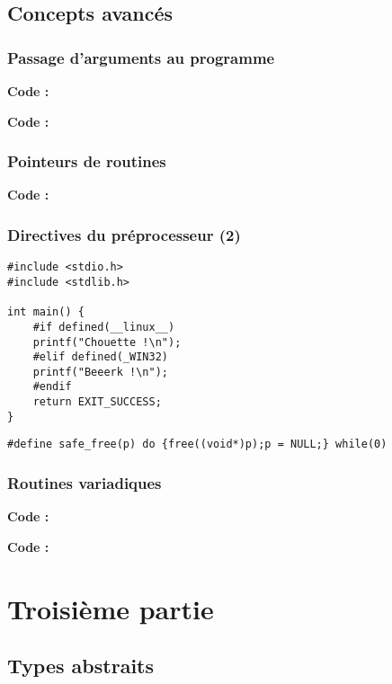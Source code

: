 \documentclass[../main.tex]{subfiles}
\begin{document}
\subsection{Concepts avancés}
\subsubsection{Passage d'arguments au programme}

\textbf{Code :} 


\textbf{Code :} 
\subsubsection{Pointeurs de routines}

\textbf{Code :} 
\subsubsection{Directives du préprocesseur (2)}
\begin{verbatim}
#include <stdio.h>
#include <stdlib.h>

int main() {
	#if defined(__linux__)
	printf("Chouette !\n");
	#elif defined(_WIN32)
	printf("Beeerk !\n");
	#endif
	return EXIT_SUCCESS;
}
\end{verbatim}
\begin{verbatim}
#define safe_free(p) do {free((void*)p);p = NULL;} while(0)
\end{verbatim}
\subsubsection{Routines variadiques}

\textbf{Code :} 


\textbf{Code :} 
\section{Troisième partie}
\subsection{Types abstraits}
\end{document}
